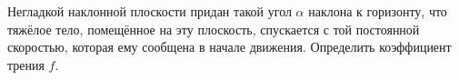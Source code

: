 Негладкой наклонной плоскости придан такой угол $\alpha$ наклона к
горизонту, что тяжёлое тело, помещённое на эту плоскость, спускается с
той постоянной скоростью, которая ему сообщена в начале движения.
Определить коэффициент трения $f$.
